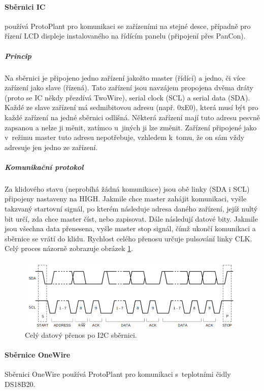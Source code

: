 \paragraph{Sběrnici IC}
používá ProtoPlant pro komunikaci se zařízeními na stejné desce, případně pro řízení LCD displeje instalovaného na řídícím panelu (připojení přes PanCon). 

\subparagraph{Princip}
Na sběrnici je připojeno jedno zařízení jakožto master (řídící) a jedno, či více zařízení jako slave (řízená).
Tato zařízení jsou navzájem propojena dvěma dráty (proto se IC někdy přezdívá TwoWire), serial clock (SCL) a serial data (SDA).
Každé ze slave zařízení má sedmibitovou adresu (např. 0xE0), která musí být pro každé zařízení na jedné sběrnici odlišná.
Některá zařízení mají tuto adresu pesvně zapsanou a nelze ji měnit, zatímco u~jiných ji lze změnit.
Zařízení připojené jako v~režimu master tuto adresu nepotřebuje, vzhledem k~tomu, že on sám vždy adresuje jen jedno ze zařízení.

\subparagraph{Komunikační protokol}
Za klidového stavu (neprobíhá žádná komunikace) jsou obě linky (SDA i SCL) připojeny nastaveny na HIGH.
Jakmile chce master zahájit komunikaci, vyšle takzvaný startovní signál, po kterém následuje adresa daného zařízení, jejíž nultý bit určí, zda chce master číst, nebo zapisovat.
Dále následují datové bity.
Jakmile jsou všechna data přenesena, vyšle master stop signál, čímž ukončí komunikaci a sběrnice se vrátí do klidu.
Rychlost celého přenosu určuje pulsování linky CLK.
Celý proces názorně zobrazuje obrázek \ref{fig:I2C-protocol}.

\begin{figure}[htbp]
   \centering
   \includegraphics[width=\textwidth]{img/I2C.png}
   \caption{Celý datový přenos po I2C sběrnici.}
   \label{fig:I2C-protocol}
\end{figure}

\paragraph{Sběrnice OneWire}
Sběrnici OneWire používá ProtoPlant pro komunikaci s~teplotními čidly DS18B20. 

